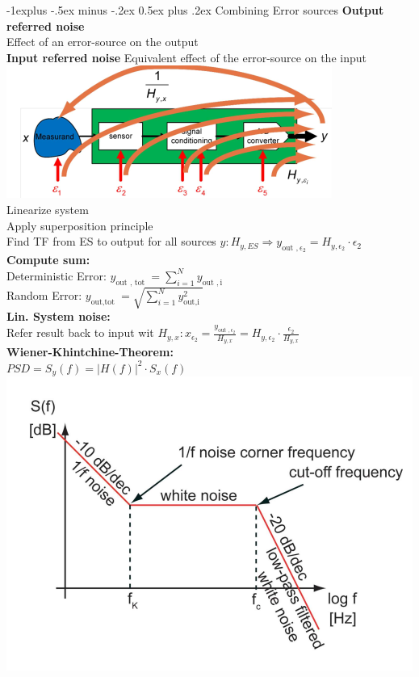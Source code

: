 \documentclass[5pt,landscape]{article}
\makeatletter
\renewcommand{\subsection}{\@startsection{subsection}{2}{0mm}%
                                {-1explus -.5ex minus -.2ex}%
                                {0.5ex plus .2ex}%
                                {\normalfont\normalsize\bfseries}}
\makeatother
\begin{document}
\begin{multicols*}{5}
\subsection{Combining Error sources}
\textbf{Output referred noise}\\
Effect of an error-source on the output\\
\textbf{Input referred noise}
Equivalent effect of the error-source on the input\\
\includegraphics[width = \columnwidth]{images/error_referral.png}\\
Linearize system\\
Apply superposition principle\\
Find TF from ES to output for all sources $ y:H_{y,ES} \Rightarrow y_{\text {out }, \epsilon_{2}}=H_{y, \epsilon_{2}} \cdot \epsilon_{2}$\\
\textbf{Compute sum:}\\
Deterministic Error: $ y_{\text {out }, \text { tot }}=\sum_{i=1}^{N} y_{\text {out }, \mathrm{i}} $\\
Random Error: $ y_{\text {out,tot }}=\sqrt{\sum_{i=1}^{N} y_{\text {out,i }}^{2}} $\\
\textbf{Lin. System noise:}\\
Refer result back to input wit $ H_{y,x}: x_{\epsilon_{2}}=\frac{y_{\text {out }, \epsilon_{2}}}{H_{y, x}}=H_{y, \epsilon_{2}} \cdot \frac{\epsilon_{2}}{H_{y, x}} $\\
\textbf{Wiener-Khintchine-Theorem:}\\
$ PSD =  S_{y}(f)=|H(f)|^{2} \cdot S_{x}(f)$
\includegraphics[width = \columnwidth]{images/noise_bode.png}

\end{multicols*}
\end{document}
